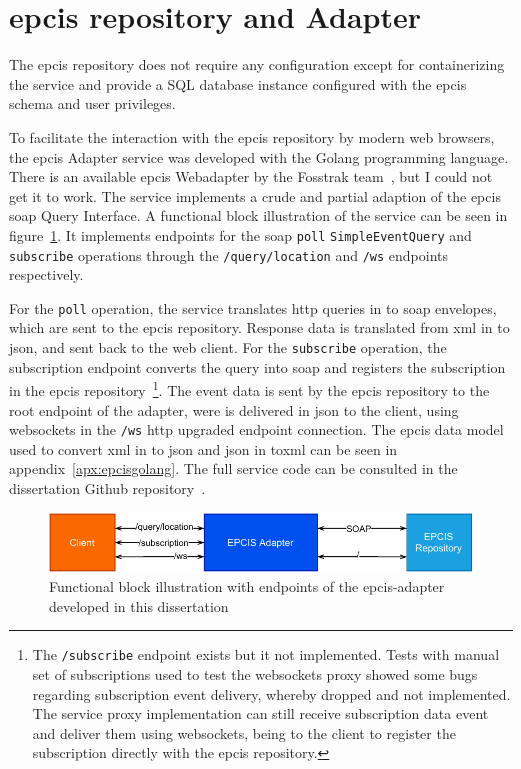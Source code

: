 \section{\acs{epcis} repository and Adapter}

The \ac{epcis} repository does not require any configuration except for containerizing the service and provide a SQL database instance configured with the \ac{epcis} schema and user privileges.

To facilitate the interaction with the \ac{epcis} repository by modern web browsers, the \ac{epcis} Adapter service was developed with the Golang programming language. There is an available \ac{epcis} Webadapter by the Fosstrak team~\cite{FosstrakEPCISEPCIS}, but I could not get it to work. The service implements a crude and partial adaption of the \ac{epcis} \ac{soap} Query Interface. A functional block illustration of the service can be seen in figure~\ref{fig:epcisadapter}. It implements endpoints for the \ac{soap} \texttt{poll} \texttt{SimpleEventQuery} and \texttt{subscribe} operations through the \texttt{/query/location} and \texttt{/ws} endpoints respectively.

For the \texttt{poll} operation, the service translates \ac{http} queries in to \ac{soap} envelopes, which are sent to the \ac{epcis} repository. Response data is translated from \ac{xml} in to \ac{json}, and sent back to the web client. 
For the \texttt{subscribe} operation, the subscription endpoint converts the query into \ac{soap} and registers the subscription in the \ac{epcis} repository~\footnote{The \texttt{/subscribe} endpoint exists but it not implemented. Tests with manual set of subscriptions used to test the websockets proxy showed some bugs regarding subscription event delivery, whereby dropped and not implemented. The service proxy implementation can still receive subscription data event and deliver them using websockets, being to the client to register the subscription directly with the \ac{epcis} repository.}. The event data is sent by the \ac{epcis} repository to the root endpoint of the adapter, were is delivered in \ac{json} to the client, using websockets in the \texttt{/ws} \ac{http} upgraded endpoint connection.
The \ac{epcis} data model used to convert \ac{xml} in to \ac{json} and \ac{json} in to\ac{xml} can be seen in appendix~\ref{apx:epcisgolang}. The full service code can be consulted in the dissertation Github repository~\cite{DvcorreiaEpcsmartshelve}.

\begin{figure}
  \centering
  \includegraphics[width=\textwidth]{figs/epcis-adapter.pdf}
  \caption{Functional block illustration with endpoints of the \acs{epcis}-adapter developed in this dissertation}
  \label{fig:epcisadapter}
\end{figure}

